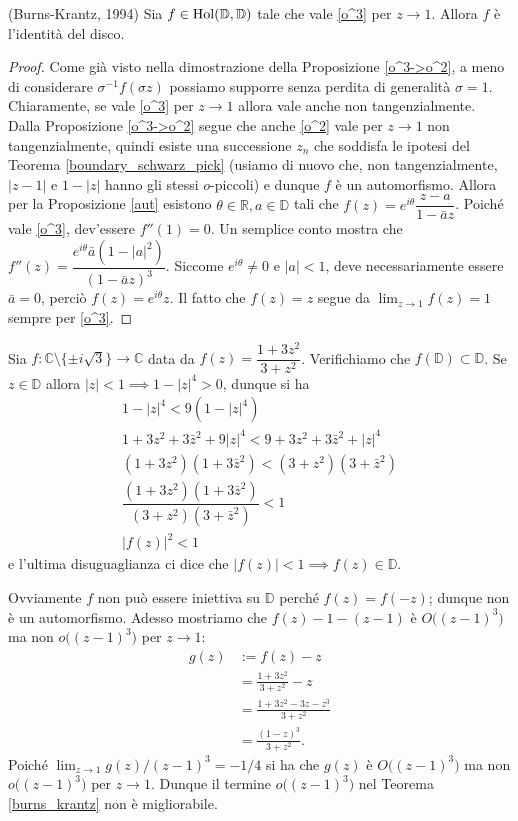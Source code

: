 \begin{thm} \label{burns_krantz}
  (Burns-Krantz, 1994) Sia $f \in \text{\normalfont{Hol}}(\mathbb{D},\mathbb{D})$ tale che vale \eqref{o^3} per $z \longrightarrow 1$. Allora $f$ è l'identità del disco.
\end{thm}

\begin{proof}
  Come già visto nella dimostrazione della Proposizione \ref{o^3->o^2}, a meno di considerare $\sigma^{-1}f(\sigma z)$ possiamo supporre senza perdita di generalità $\sigma=1$. Chiaramente, se vale \eqref{o^3} per $z \longrightarrow 1$ allora vale anche non tangenzialmente.
  Dalla Proposizione \ref{o^3->o^2} segue che anche \eqref{o^2} vale per $z \longrightarrow 1$ non tangenzialmente, quindi esiste una successione $z_n$ che soddisfa le ipotesi del Teorema \ref{boundary_schwarz_pick} (usiamo di nuovo che, non tangenzialmente, $|z-1|$ e $1-|z|$ hanno gli stessi $o$-piccoli) e dunque $f$ è un automorfismo.
  Allora per la Proposizione \ref{aut} esistono $\theta \in \mathbb{R}, a \in \mathbb{D}$ tali che $f(z)=e^{i\theta}\dfrac{z-a}{1-\bar{a}z}$. Poiché vale \eqref{o^3}, dev'essere $f''(1)=0$. Un semplice conto mostra che $f''(z)=\dfrac{e^{i\theta}\bar{a}(1-|a|^2)}{(1-\bar{a}z)^3}$.
  Siccome $e^{i\theta}\not=0$ e $|a|<1$, deve necessariamente essere $\bar{a}=0$, perciò $f(z)=e^{i\theta}z$. Il fatto che $f(z)=z$ segue da $\displaystyle \lim_{z \longrightarrow 1} f(z)=1$ sempre per \eqref{o^3}.
\end{proof}

\begin{ex}
  Sia $f:\mathbb{C}\setminus\{\pm i\sqrt{3}\} \longrightarrow \mathbb{C}$ data da $f(z)=\dfrac{1+3z^2}{3+z^2}$. Verifichiamo che $f(\mathbb{D}) \subset \mathbb{D}$. Se $z \in \mathbb{D}$ allora $|z|<1 \implies 1-|z|^4>0$, dunque si ha
  \begin{gather*}
    1-|z|^4 < 9(1-|z|^4) \\
    1+3z^2+3\bar{z}^2+9|z|^4 < 9+3z^2+3\bar{z}^2+|z|^4 \\
    (1+3z^2)(1+3\bar{z}^2) < (3+z^2)(3+\bar{z}^2) \\
    \dfrac{(1+3z^2)(1+3\bar{z}^2)}{(3+z^2)(3+\bar{z}^2)} < 1 \\
    |f(z)|^2<1
  \end{gather*}
  e l'ultima disuguaglianza ci dice che $|f(z)|<1 \implies f(z) \in \mathbb{D}$.

  Ovviamente $f$ non può essere iniettiva su $\mathbb{D}$ perché $f(z)=f(-z)$; dunque non è un automorfismo. Adesso mostriamo che $f(z)-1-(z-1)$ è $O\bigl((z-1)^3\bigr)$ ma non $o\bigl((z-1)^3\bigr)$ per $z \longrightarrow 1$:
  \begin{align*}
    g(z) & := f(z)-z \\
    & =\frac{1+3z^2}{3+z^2}-z \\
    & =\frac{1+3z^2-3z-z^3}{3+z^2} \\
    & =\frac{(1-z)^3}{3+z^2}.
  \end{align*}
  Poiché $\displaystyle \lim_{z \longrightarrow 1} g(z)/(z-1)^3=-1/4$ si ha che $g(z)$ è $O\bigl((z-1)^3\bigr)$ ma non $o\bigl((z-1)^3\bigr)$ per $z \longrightarrow 1$. Dunque il termine $o\bigl((z-1)^3\bigr)$ nel Teorema \ref{burns_krantz} non è migliorabile.
\end{ex}
